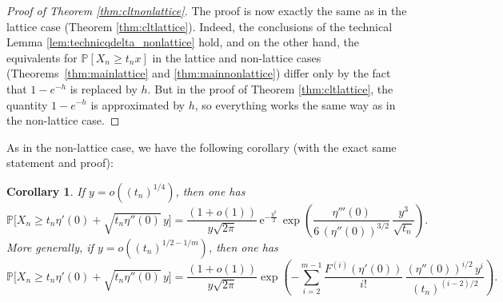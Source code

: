 \documentclass[12pt,a4paper,reqno]{amsart}
\newtheorem{corollary}[lemma]{Corollary}
\theoremstyle{remark}
\newcommand{\E}{\mathrm{e}}
\newcommand{\proba}{\mathbb{P}}
\begin{document}
\begin{proof}[Proof of Theorem \ref{thm:cltnonlattice}]
The proof is now exactly the same as in the lattice case (Theorem \ref{thm:cltlattice}). Indeed, the conclusions of the technical Lemma \ref{lem:technicqdelta_nonlattice} hold, and on the other hand, the equivalents for $\proba[X_{n}\geq t_{n}x ]$ in the lattice and non-lattice cases (Theorems~\ref{thm:mainlattice} and \ref{thm:mainnonlattice}) differ only by the fact that $1-e^{-h}$ is replaced by $h$. But in the proof of Theorem \ref{thm:cltlattice}, the quantity $1-e^{-h}$ is approximated by $h$, so everything works the same way as in the non-lattice case.
\end{proof}
\bigskip

As in the non-lattice case, we have the following corollary (with the exact same statement and proof):
\begin{corollary}
    If $y=o((t_n)^{1/4})$, then one has
\begin{equation}
    \proba\big[X_n \ge t_n \eta'(0) + \sqrt{t_n \eta''(0)}\, y\big] 
    =\frac{(1+o(1))}{y\sqrt{2\pi}}\, \E^{-\frac{y^2}{2}}\, \exp\left( \frac{\eta'''(0)}{6\,(\eta''(0))^{3/2}}\,\frac{y^3}{\sqrt{t_n}}
    \right).
\label{EqCramerOrdre3NL}
\end{equation}
More generally, if $y=o((t_n)^{1/2-1/m})$, then one has
\begin{equation}
    \proba\big[X_n \ge t_n \eta'(0) + \sqrt{t_n \eta''(0)}\, y\big] 
    =\frac{(1+o(1))}{y\sqrt{2\pi}} \exp\left( -\sum_{i=2}^{m-1} \frac{F^{(i)}(\eta'(0))}{i!}\,\frac{(\eta''(0))^{i/2} \,y^i}{(t_n)^{(i-2)/2}}
    \right) .
\label{EqCramerOrdreMNL}
\end{equation}
\end{corollary}
\end{document}
